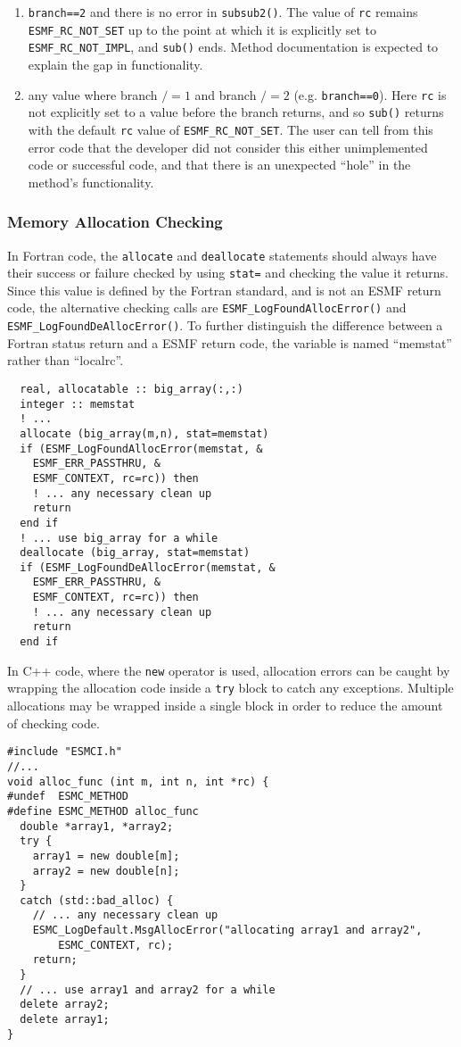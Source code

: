 \begin{enumerate}
\item {\tt branch==2} and there is no error in {\tt subsub2()}. The value of {\tt rc} remains {\tt ESMF\_RC\_NOT\_SET} up to the point at which it is explicitly set to {\tt ESMF\_RC\_NOT\_IMPL}, and {\tt sub()} ends. Method documentation is expected to explain the gap in functionality.

\item any value where branch $/=1$ and branch $/= 2$ (e.g. {\tt branch==0}). Here {\tt rc} is not explicitly set to a value before the branch returns, and so {\tt sub()} returns with the default {\tt rc} value of {\tt ESMF\_RC\_NOT\_SET}. The user can tell from this error code that the developer did not consider this either unimplemented code or successful code, and that there is an unexpected ``hole'' in the method's functionality. 

\end{enumerate}

\subsubsection{Memory Allocation Checking}

In Fortran code, the {\tt allocate} and {\tt deallocate} statements should
always have their success or failure checked by using {\tt stat=} and checking
the value it returns.  Since this value is defined by the Fortran
standard, and is not an ESMF return code, the alternative checking calls are
{\tt ESMF\_LogFoundAllocError()} and {\tt ESMF\_LogFoundDeAllocError()}.
To further distinguish the difference between a Fortran status return
and a ESMF return code, the variable is named ``memstat'' rather than
``localrc''.

\begin{verbatim}
  real, allocatable :: big_array(:,:)
  integer :: memstat
  ! ...
  allocate (big_array(m,n), stat=memstat)
  if (ESMF_LogFoundAllocError(memstat, &
    ESMF_ERR_PASSTHRU, &
    ESMF_CONTEXT, rc=rc)) then
    ! ... any necessary clean up
    return
  end if
  ! ... use big_array for a while
  deallocate (big_array, stat=memstat)
  if (ESMF_LogFoundDeAllocError(memstat, &
    ESMF_ERR_PASSTHRU, &
    ESMF_CONTEXT, rc=rc)) then
    ! ... any necessary clean up
    return
  end if
\end{verbatim}

In C++ code, where the {\tt new} operator is used, allocation errors can
be caught by wrapping the allocation code inside a {\tt try} block to catch
any exceptions.  Multiple allocations may be wrapped inside a single block
in order to reduce the amount of checking code.

\begin{verbatim}
#include "ESMCI.h"
//...
void alloc_func (int m, int n, int *rc) {
#undef  ESMC_METHOD
#define ESMC_METHOD alloc_func
  double *array1, *array2;
  try {
    array1 = new double[m];
    array2 = new double[n];
  }
  catch (std::bad_alloc) {
    // ... any necessary clean up
    ESMC_LogDefault.MsgAllocError("allocating array1 and array2",
        ESMC_CONTEXT, rc);
    return;
  }
  // ... use array1 and array2 for a while
  delete array2;
  delete array1;
}
\end{verbatim}
